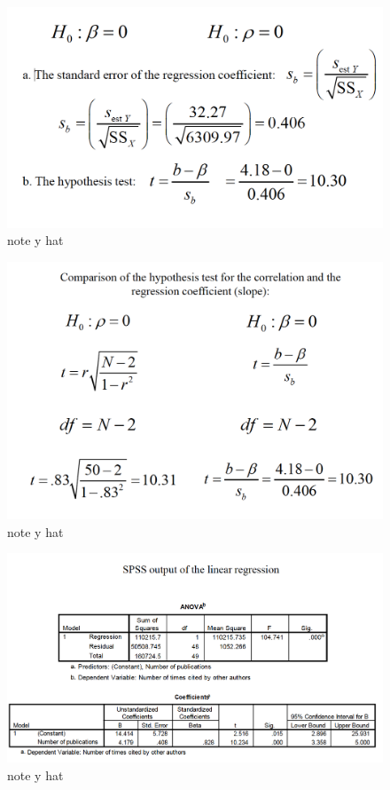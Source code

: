 \documentclass[]{book}
\theoremstyle{definition}
\theoremstyle{definition}
\theoremstyle{definition}
\theoremstyle{remark}
\begin{document}
{\begin{figure}
\centering
\includegraphics{img/hicksreg21.png}
\caption{note y hat}
\end{figure}

\begin{figure}
\centering
\includegraphics{img/hicksreg22.png}
\caption{note y hat}
\end{figure}

\begin{figure}
\centering
\includegraphics{img/hicksreg23.png}
\caption{note y hat}
\end{figure}

}
\end{document}
